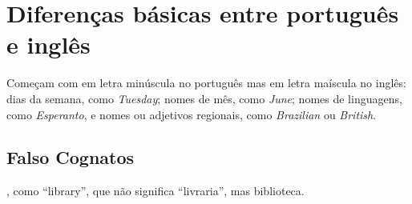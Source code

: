 \documentclass[openany]{book}
\begin{document}
\section{Diferenças básicas entre português e inglês}

\begin{outline}
    \1 Começam com em letra minúscula no português mas em letra maíscula no inglês:
    \2 dias da semana, como \textit{Tuesday};
    \2 nomes de mês, como \textit{June};
    \2 nomes de linguagens, como \textit{Esperanto}, e
    \2 nomes ou adjetivos regionais, como \textit{Brazilian} ou \textit{British}.
\end{outline}

\subsection{Falso Cognatos}

, como ``library'', que não significa ``livraria'', mas biblioteca.

\end{document}
